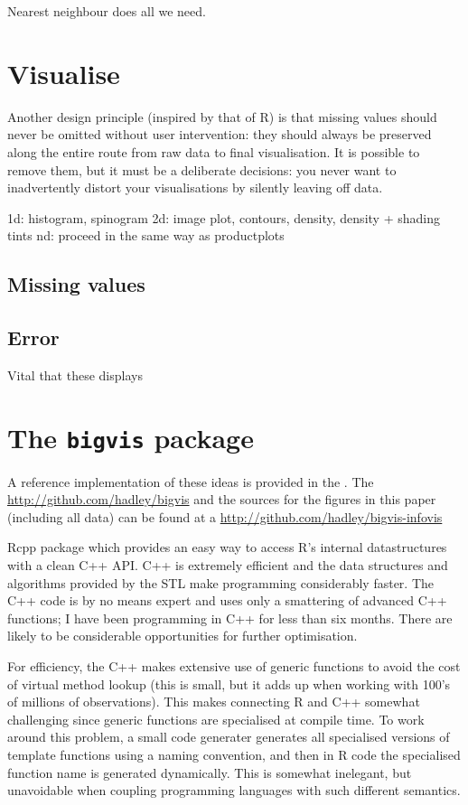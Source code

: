 \documentclass[journal]{vgtc}                %
\begin{document}
Nearest neighbour does all we need. 


\section{Visualise}
\label{sec:visualise}

Another design principle (inspired by that of R) is that missing values should never be omitted without user intervention: they should always be preserved along the entire route from raw data to final visualisation. It is possible to remove them, but it must be a deliberate decisions: you never want to inadvertently distort your visualisations by silently leaving off data.


1d: histogram, spinogram
2d: image plot, contours, density, density + shading tints
nd: proceed in the same way as productplots

\subsection{Missing values}

\subsection{Error}

Vital that these displays

\section{The {\tt bigvis} package}
\label{sec:bigvis}

A reference implementation of these ideas is provided in the .  The \url{http://github.com/hadley/bigvis} and the sources for the figures in this paper (including all data) can be found at a \url{http://github.com/hadley/bigvis-infovis}

Rcpp package which provides an easy way to access R's internal datastructures with a clean C++ API.  C++ is extremely efficient and the data structures and algorithms provided by the STL make programming considerably faster.  The C++ code is by no means expert and uses only a smattering of advanced C++ functions; I have been programming in C++ for less than six months. There are likely to be considerable opportunities for further optimisation.

For efficiency, the C++ makes extensive use of generic functions to avoid the cost of virtual method lookup (this is small, but it adds up when working with 100's of millions of observations).  This makes connecting R and C++ somewhat challenging since generic functions are specialised at compile time. To work around this problem, a small code generater generates all specialised versions of template functions using a naming convention, and then in R code the specialised function name is generated dynamically.  This is somewhat inelegant, but unavoidable when coupling programming languages with such different semantics.
\end{document}
